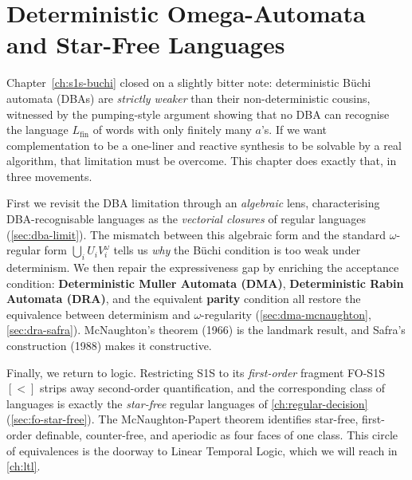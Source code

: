 
\chapter{Deterministic Omega-Automata and Star-Free Languages}
\label{ch:deterministic-automata-star-free}

Chapter~\ref{ch:s1s-buchi} closed on a slightly bitter note: deterministic Büchi automata (DBAs) are \emph{strictly weaker} than their non-deterministic cousins, witnessed by the pumping-style argument showing that no DBA can recognise the language $L_{\mathrm{fin}}$ of words with only finitely many $a$'s. If we want complementation to be a one-liner and reactive synthesis to be solvable by a real algorithm, that limitation must be overcome. This chapter does exactly that, in three movements.

First we revisit the DBA limitation through an \emph{algebraic} lens, characterising DBA-recognisable languages as the \emph{vectorial closures} of regular languages (\cref{sec:dba-limit}). The mismatch between this algebraic form and the standard $\omega$-regular form $\bigcup_i U_i V_i^\omega$ tells us \emph{why} the Büchi condition is too weak under determinism. We then repair the expressiveness gap by enriching the acceptance condition: \textbf{Deterministic Muller Automata (DMA)}, \textbf{Deterministic Rabin Automata (DRA)}, and the equivalent \textbf{parity} condition all restore the equivalence between determinism and $\omega$-regularity (\cref{sec:dma-mcnaughton}, \cref{sec:dra-safra}). McNaughton's theorem (1966) is the landmark result, and Safra's construction (1988) makes it constructive.

Finally, we return to logic. Restricting S1S to its \emph{first-order} fragment FO-S1S$[<]$ strips away second-order quantification, and the corresponding class of languages is exactly the \emph{star-free} regular languages of \cref{ch:regular-decision} (\cref{sec:fo-star-free}). The McNaughton-Papert theorem identifies star-free, first-order definable, counter-free, and aperiodic as four faces of one class. This circle of equivalences is the doorway to Linear Temporal Logic, which we will reach in \cref{ch:ltl}.


